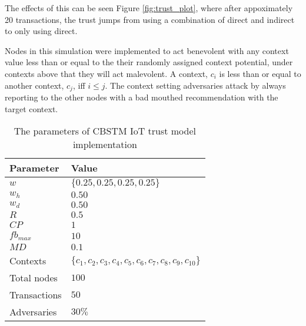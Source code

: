 \documentclass{article}
\begin{document}
    The effects of this can be seen Figure \ref{fig:trust_plot}, where after appoximately 20
    transactions, the trust jumps from using a combination of direct and indirect to
    only using direct.

    Nodes in this simulation were implemented to act benevolent with any context
    value less than or equal to the their randomly assigned context potential,
    under contexts above that they will act malevolent. A context, $c_i$ is less than or
    equal to another context, $c_j$, iff $i \leq j$. The context setting
    adversaries attack by always reporting to the other nodes with a bad
    mouthed recommendation with the target context.

    \begin{table}
        \begin{tabularx}{\textwidth}{X X}
            \toprule
            \textbf{Parameter} & \textbf{Value} \\
            \midrule
            $w$ & $\{0.25, 0.25, 0.25, 0.25\}$ \\
            \midrule
            $w_h$ & $0.50$ \\
            \midrule
            $w_d$ & $0.50$ \\
            \midrule
            $R$ & $0.5$ \\
            \midrule
            $CP$ & $1$ \\
            \midrule
            $fb_{max}$ & $10$ \\
            \midrule
            $MD$ & $0.1$ \\
            \midrule
            Contexts & $\{c_1, c_2, c_3, c_4, c_5, c_6, c_7, c_8, c_9, c_{10}\}$ \\
            \midrule
            Total nodes & $ 100 $ \\
            \midrule
            Transactions & $ 50 $ \\
            \midrule
            Adversaries & $ 30\% $ \\
            \bottomrule
        \end{tabularx}
        \caption{The parameters of CBSTM IoT trust model implementation}
        \label{table:sim-params}
    \end{table}

    \newpage
\end{document}
